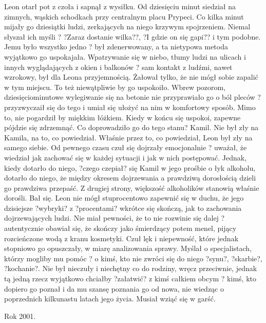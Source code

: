 \documentclass[../MAIN.tex]{subfiles}
\begin{document}
Leon otarł pot z czoła i sapnął z wysiłku.
Od dziesięciu minut siedział na zimnych, wąskich schodkach przy centralnym placu Prypeci. Co kilka minut mijały go dziesiątki ludzi, zerkających na niego krzywym spojrzeniem. Niemal słyszał ich myśli ? ?Zaraz dostanie wilka??, ?I gdzie on się gapi?? i tym podobne. Jemu było wszystko jedno ? był zdenerwowany, a ta nietypowa metoda wyjątkowo go uspokajała. Wpatrywanie się w niebo, tłumy ludzi na ulicach i innych wyglądających z okien i balkonów ? sam kontakt z ludźmi, nawet wzrokowy, był dla Leona przyjemnością.
Żałował tylko, że nie mógł sobie zapalić w tym miejscu. To też niewątpliwie by go uspokoiło.
Wbrew pozorom, dziesięciominutowe wylegiwanie się na betonie nie przyprawiało go o ból pleców ? przyzwyczaił się do tego i umiał się ułożyć na nim w komfortowy sposób. Mimo to, nie pogardził by miękkim łóżkiem. Kiedy w końcu się uspokoi, zapewne pójdzie się zdrzemnąć. Co doprowadziło go do tego stanu?
Kamil.
Nie był zły na Kamila, na to, co powiedział. Właśnie przez to, co powiedział, Leon był zły na samego siebie.
Od pewnego czasu czuł się dojrzały emocjonalnie ? uważał, że wiedział jak zachować się w każdej sytuacji i jak w nich postępować. Jednak, kiedy dotarło do niego, ?czego czepiał? się Kamil w jego prośbie o łyk alkoholu, dotarło do niego, że między okresem dojrzewania a prawdziwą dorosłością dzieli go prawdziwa przepaść.
Z drugiej strony, większość alkoholików stanowią właśnie dorośli.
Bał się.
Leon nie mógł stuprocentowo zapewnić się w duchu, że jego dzisiejsze ?wybryki? z ?procentami? wkrótce się skończą, jak to zachowania dojrzewających ludzi. Nie miał pewności, że to nie rozwinie się dalej ? autentycznie obawiał się, że skończy jako śmierdzący potem menel, pijący rozcieńczone wodą z kranu kosmetyki. Czuł lęk i niepewność, które jednak stopniowo go opuszczały, w miarę analizowania sprawy.
Myślał o specjalistach, którzy mogliby mu pomóc ? o kimś, kto nie zwróci się do niego ?synu?, ?skarbie?, ?kochanie?. Nie był nieczuły i niechętny co do rodziny, wręcz przeciwnie, jednak tą jedną rzecz wyjątkowo chciałby ?załatwić? z kimś całkiem obcym ? kimś, kto dopiero go poznał i da mu szansę poznania go od nowa, nie wiedząc o poprzednich kilkunastu latach jego życia.
Musiał wziąć się w garść.


Rok 2001.
\end{document}
